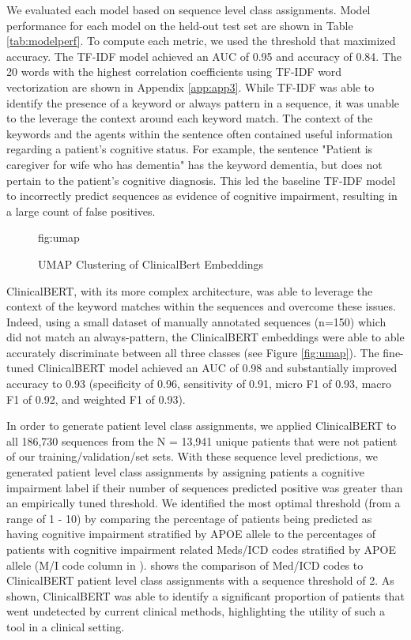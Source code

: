 \documentclass[pmlr,twocolumn,10pt]{jmlr} %
\begin{document}

We evaluated each model based on sequence level class assignments. Model performance for each model on the held-out test set are shown in Table \ref{tab:modelperf}. To compute each metric, we used the threshold that maximized accuracy. The TF-IDF model achieved an AUC of 0.95 and accuracy of 0.84. The 20 words with the highest correlation coefficients using TF-IDF word vectorization are shown in Appendix \ref{app:app3}. While TF-IDF was able to identify the presence of a keyword or always pattern in a sequence, it was unable to the leverage the context around each keyword match. The context of the keywords and the agents within the sentence often contained useful information regarding a patient's cognitive status. For example, the sentence "Patient is caregiver for wife who has dementia" has the keyword dementia, but does not pertain to the patient's cognitive diagnosis. This led the baseline TF-IDF model to incorrectly predict sequences as evidence of cognitive impairment, resulting in a large count of false positives.

\begin{figure}[htb]
\floatconts
{fig:umap}
{\caption{UMAP Clustering of ClinicalBert Embeddings}}
\end{figure}

ClinicalBERT, with its more complex architecture, was able to leverage the context of the keyword matches within the sequences and overcome these issues. Indeed, using a small dataset of manually annotated sequences (n=150) which did not match an always-pattern, the ClinicalBERT embeddings were able to able accurately discriminate between all three classes (see Figure \ref{fig:umap}). The fine-tuned ClinicalBERT model achieved an AUC of 0.98 and substantially improved accuracy to 0.93 (specificity of 0.96, sensitivity of 0.91, micro F1 of 0.93, macro F1 of 0.92, and weighted F1 of 0.93). 

In order to generate patient level class assignments, we applied ClinicalBERT to all 186,730 sequences from the N = 13,941 unique patients that were not patient of our training/validation/set sets. With these sequence level predictions, we generated patient level class assignments by assigning patients a cognitive impairment label if their number of sequences predicted positive was greater than an empirically tuned threshold. We identified the most optimal threshold (from a range of 1 - 10) by comparing the percentage of patients being predicted as having cognitive impairment stratified by APOE allele to the percentages of patients with cognitive impairment related Meds/ICD codes stratified by APOE allele (M/I code column in ).  shows the comparison of Med/ICD codes to ClinicalBERT patient level class assignments with a sequence threshold of 2. As shown, ClinicalBERT was able to identify a significant proportion of patients that went undetected by current clinical methods, highlighting the utility of such a tool in a clinical setting. 
\end{document}

